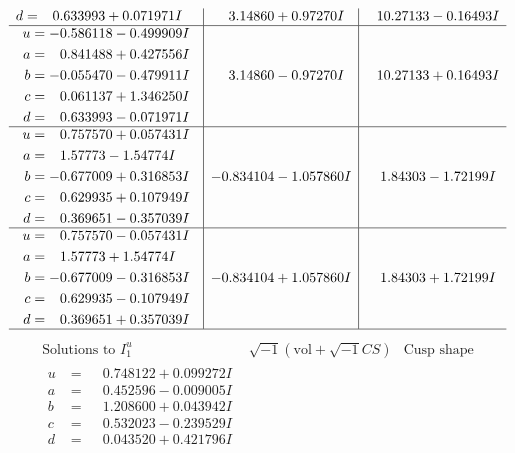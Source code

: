 \documentclass[1p]{elsarticle_modified}
\theoremstyle{definition}
\newcommand{\I}{\sqrt{-1}}
\begin{document}
$$\begin{array}{c|c|c}
\begin{aligned}
d &= \phantom{-}0.633993 + 0.071971 I\end{aligned}
 & \phantom{-}3.14860 + 0.97270 I & \phantom{-}10.27133 - 0.16493 I \\ \hline\begin{aligned}
u &= -0.586118 - 0.499909 I \\
a &= \phantom{-}0.841488 + 0.427556 I \\
b &= -0.055470 - 0.479911 I \\
c &= \phantom{-}0.061137 + 1.346250 I \\
d &= \phantom{-}0.633993 - 0.071971 I\end{aligned}
 & \phantom{-}3.14860 - 0.97270 I & \phantom{-}10.27133 + 0.16493 I \\ \hline\begin{aligned}
u &= \phantom{-}0.757570 + 0.057431 I \\
a &= \phantom{-}1.57773 - 1.54774 I \\
b &= -0.677009 + 0.316853 I \\
c &= \phantom{-}0.629935 + 0.107949 I \\
d &= \phantom{-}0.369651 - 0.357039 I\end{aligned}
 & -0.834104 - 1.057860 I & \phantom{-}1.84303 - 1.72199 I \\ \hline\begin{aligned}
u &= \phantom{-}0.757570 - 0.057431 I \\
a &= \phantom{-}1.57773 + 1.54774 I \\
b &= -0.677009 - 0.316853 I \\
c &= \phantom{-}0.629935 - 0.107949 I \\
d &= \phantom{-}0.369651 + 0.357039 I\end{aligned}
 & -0.834104 + 1.057860 I & \phantom{-}1.84303 + 1.72199 I\\
 \hline 
 \end{array}$$\newpage$$\begin{array}{c|c|c}  
\text{Solutions to }I^u_{1}& \I (\text{vol} + \sqrt{-1}CS) & \text{Cusp shape}\\
 \hline 
\begin{aligned}
u &= \phantom{-}0.748122 + 0.099272 I \\
a &= \phantom{-}0.452596 - 0.009005 I \\
b &= \phantom{-}1.208600 + 0.043942 I \\
c &= \phantom{-}0.532023 - 0.239529 I \\
d &= \phantom{-}0.043520 + 0.421796 I\end{aligned}

\end{array}$$
\end{document}

